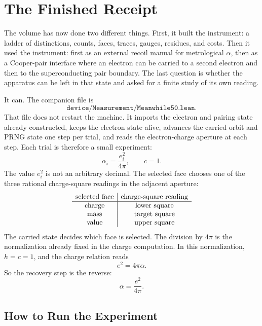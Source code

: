 \chapter{The Finished Receipt}

The volume has now done two different things. First, it built the instrument: a ladder of distinctions, counts,
faces, traces, gauges, residues, and costs. Then it used the instrument: first as an external recoil manual for
metrological \(\alpha\), then as a Cooper-pair interface where an electron can be carried to a second electron
and then to the superconducting pair boundary. The last question is whether the apparatus can be left in that
state and asked for a finite study of its own reading.

It can. The companion file is
\[
  \texttt{device/Measurement/Meanwhile50.lean}.
\]
That file does not restart the machine. It imports the electron and pairing state already constructed, keeps the
electron state alive, advances the carried orbit and PRNG state one step per trial, and reads the electron-charge
aperture at each step. Each trial is therefore a small experiment:
\[
  \alpha_i = \frac{e_i^2}{4\pi},
  \qquad c=1.
\]
The value \(e_i^2\) is not an arbitrary decimal. The selected face chooses one of the three rational
charge-square readings in the adjacent aperture:
\[
\begin{array}{c|c}
\hbox{selected face} & \hbox{charge-square reading}\\
\hline
\hbox{charge} & \hbox{lower square}\\
\hbox{mass} & \hbox{target square}\\
\hbox{value} & \hbox{upper square}
\end{array}
\]
The carried state decides which face is selected. The division by \(4\pi\) is the normalization already fixed in
the charge computation. In this normalization, \(h=c=1\), and the charge relation reads
\[
  e^2 = 4\pi\alpha.
\]
So the recovery step is the reverse:
\[
  \alpha = \frac{e^2}{4\pi}.
\]

\section{How to Run the Experiment}

